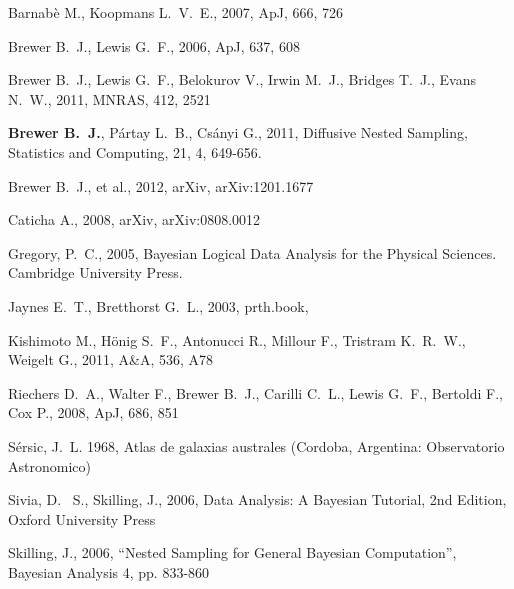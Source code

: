 \documentclass[letterpaper, 11pt]{article}
\begin{document}
\begin{thebibliography}{99}
 Barnab{\`e} M., Koopmans L.~V.~E., 2007, ApJ, 666, 726 

 Brewer B.~J., Lewis G.~F., 2006, ApJ, 637, 608 

Brewer B.~J., Lewis G.~F., Belokurov V., Irwin M.~J., Bridges T.~J., Evans 
N.~W., 2011, MNRAS, 412, 2521 

 {\bf Brewer B.~J.}, P{\'a}rtay L.~B., Cs{\'a}nyi G., 2011, Diffusive Nested Sampling, 
Statistics and Computing, 21, 4, 649-656.

Brewer B.~J., et al., 2012, arXiv, arXiv:1201.1677 

Caticha A., 2008, arXiv, arXiv:0808.0012 

 Gregory, P.~C., 2005, 
Bayesian Logical Data Analysis for the Physical Sciences. Cambridge 
University Press.\ 

 Jaynes E.~T., Bretthorst G.~L., 2003, prth.book,  

 Kishimoto M., H{\"o}nig S.~F., Antonucci R., Millour F., Tristram K.~R.~W., Weigelt G., 2011, A\&A, 536, A78 

 Riechers D.~A., Walter F., Brewer B.~J., 
Carilli C.~L., Lewis G.~F., Bertoldi F., Cox P., 2008, ApJ, 686, 851 

{S{\'e}rsic}, J.~L. 1968, {Atlas de galaxias australes} (Cordoba, Argentina:
  Observatorio Astronomico)


 Sivia, 
D.~ S., Skilling, J., 2006, Data Analysis: A Bayesian Tutorial, 2nd 
Edition, Oxford University Press

 Skilling, 
J., 2006, ``Nested Sampling for General Bayesian Computation'', Bayesian 
Analysis 4, pp. 833-860


\end{thebibliography}
\end{document}
